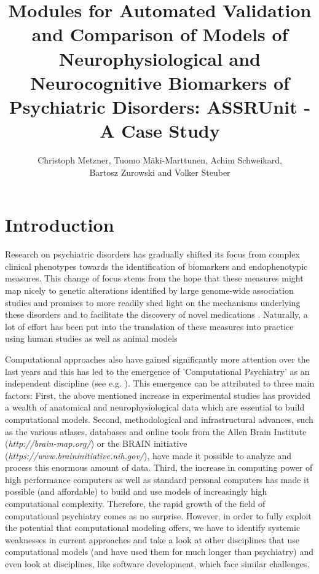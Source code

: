 \documentclass[a4paper,10pt]{article}
\title{Modules for Automated Validation and Comparison of Models of Neurophysiological and Neurocognitive Biomarkers of Psychiatric Disorders:
ASSRUnit - A Case Study}
\author{Christoph Metzner, Tuomo M\"aki-Marttunen, Achim Schweikard, \\ Bartosz Zurowski and Volker Steuber}
\begin{document}
\lstset{language=Python}

\maketitle

\begin{abstract}

\end{abstract}

\section{Introduction}
Research on psychiatric disorders has gradually shifted its focus from
complex clinical phenotypes towards the identification of biomarkers and 
endophenotypic measures. This change of focus stems from the hope
that these measures might map nicely to genetic 
alterations identified by large genome-wide association studies \cite{Meyer2006} and promises to more readily shed light on the mechanisms underlying
these disorders and to facilitate the discovery of novel medications \cite{Siekmeier2015}.
Naturally, a lot of effort has been put into the translation of these measures into practice using human studies \cite{Perlis2011}
as well as animal models \cite{Markou2009}

Computational approaches also have gained significantly more attention over the last years and this has led to the emergence of 
'Computational Psychiatry'
as an independent discipline (see e.g. \cite{Montague2012,Wang2014,Friston2014,Corlett2014,Stephan2014,Adams2016}).
This emergence can be attributed to three main factors: First, the above mentioned increase in experimental studies has provided 
a wealth of anatomical and neurophysiological data which are essential to build  computational models. Second, methodological and infrastructural advances,
such as the  various atlases, databases and online tools from the Allen Brain Institute (\textit{http://brain-map.org/}) or the BRAIN initiative 
(\textit{https://www.braininitiative.nih.gov/}),
have made it possible to analyze and process this enormous amount of data. Third, the increase in computing power of high performance
computers as well as standard personal computers has made it possible (and affordable) to build and use models of increasingly high computational 
complexity. Therefore, the rapid growth of the field of computational psychiatry comes as no surprise.
However, in order to fully exploit the potential that computational modeling offers, we have to identify systemic weaknesses
in current approaches and take a look at other disciplines that use computational models (and have used them for much longer than psychiatry)
and even look at disciplines, like software development, which face similar challenges.
\end{document}
